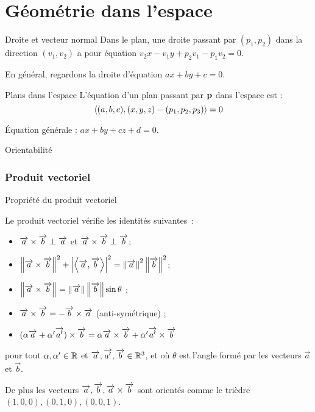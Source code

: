 \documentclass[french,t,handout,xcolor=svgnames]{beamer}
\begin{document}
\section{Géométrie dans l'espace}
\begin{frame}{Droite et vecteur normal}
  Dans le plan, une droite passant par $(p_1,p_2)$ dans la direction $(v_1,v_2)$ a pour équation $v_2 x - v_1 y + p_2v_1-p_1v_2 = 0$.

  En général, regardons la droite d'équation $ax+by + c = 0$.
\end{frame}
\begin{frame}{Plans dans l'espace}
  L'équation d'un plan passant par $\mathbf{p}$ dans l'espace est :
  \begin{equation*}
    \left\langle (a,b,c),(x,y,z) - (p_1,p_2,p_3)\right\rangle = 0
  \end{equation*}
  
  Équation générale : $ax+by+cz + d = 0$.
\end{frame}
\begin{frame}{Orientabilité}
  
\end{frame}
\begin{frame}
  \frametitle{Produit vectoriel}
  
\end{frame}
\begin{frame}{Propriété du produit vectoriel}
\begin{proposition}Le produit vectoriel vérifie les identités suivantes~:
    \begin{itemize}
    \item \(\overrightarrow{a} \times \overrightarrow{b} \perp \overrightarrow{a}\) et \(\overrightarrow{a} \times \overrightarrow{b} \perp \overrightarrow{b}\);
    \item \(\left\Vert\overrightarrow{a} \times \overrightarrow{b}\right\Vert^{2} + \left\vert\left\langle \overrightarrow{a} ,\overrightarrow{b}\right\rangle\right\vert^{2} = \left\Vert\overrightarrow{a}\right\Vert^{2} \left\Vert\overrightarrow{b}\right\Vert^{2}\);
    \item \(\left\Vert\overrightarrow{a} \times \overrightarrow{b}\right\Vert = \left\Vert\overrightarrow{a}\right\Vert \left\Vert\overrightarrow{b}\right\Vert \sin \theta \) ;
    \item \(\overrightarrow{a} \times \overrightarrow{b} = -\overrightarrow{b} \times \overrightarrow{a}\) (anti-symétrique) ;
    \item \((\alpha \overrightarrow{a} + \alpha' \overrightarrow{a'}) \times \overrightarrow{b} = \alpha {\overrightarrow{a} \times\overrightarrow{b}} + \alpha' {\overrightarrow{a'} \times \overrightarrow{b}}\)
    \end{itemize}
    pour tout \(\alpha, \alpha' \in \mathbb{R}\) et \(\overrightarrow{a}, \overrightarrow{a'}, \overrightarrow{b} \in \mathbb{R}^{3}\), et où \(\theta\) est l'angle formé par les vecteurs \(\vec a\) et \(\vec b\).
  \end{proposition}
  
  De plus les vecteurs $\overrightarrow{a}, \overrightarrow{b}, \overrightarrow{a} \times \overrightarrow{b}$ sont orientés comme le trièdre $(1,0,0), (0,1,0), (0,0,1)$.
\end{frame}
\end{document}
